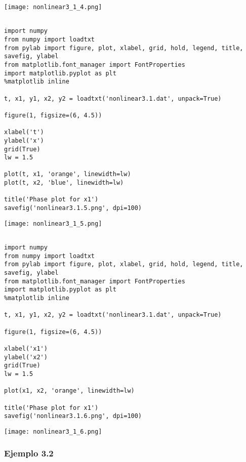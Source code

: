 \documentclass{article} %
\begin{document}
\begin{center}
	\texttt{[image: nonlinear3\_1\_4.png]}
\end{center}




\begin{verbatim} 

import numpy
from numpy import loadtxt
from pylab import figure, plot, xlabel, grid, hold, legend, title, savefig, ylabel
from matplotlib.font_manager import FontProperties
import matplotlib.pyplot as plt
%matplotlib inline

t, x1, y1, x2, y2 = loadtxt('nonlinear3.1.dat', unpack=True)

figure(1, figsize=(6, 4.5))

xlabel('t')
ylabel('x')
grid(True)
lw = 1.5

plot(t, x1, 'orange', linewidth=lw)
plot(t, x2, 'blue', linewidth=lw)

title('Phase plot for x1')
savefig('nonlinear3.1.5.png', dpi=100)

\end{verbatim}


\begin{center}
	\texttt{[image: nonlinear3\_1\_5.png]}
\end{center}




\begin{verbatim} 

import numpy
from numpy import loadtxt
from pylab import figure, plot, xlabel, grid, hold, legend, title, savefig, ylabel
from matplotlib.font_manager import FontProperties
import matplotlib.pyplot as plt
%matplotlib inline

t, x1, y1, x2, y2 = loadtxt('nonlinear3.1.dat', unpack=True)

figure(1, figsize=(6, 4.5))

xlabel('x1')
ylabel('x2')
grid(True)
lw = 1.5

plot(x1, x2, 'orange', linewidth=lw)

title('Phase plot for x1')
savefig('nonlinear3.1.6.png', dpi=100)

\end{verbatim}


\begin{center}
	\texttt{[image: nonlinear3\_1\_6.png]}
\end{center}


\subsubsection{Ejemplo 3.2}
\end{document}
